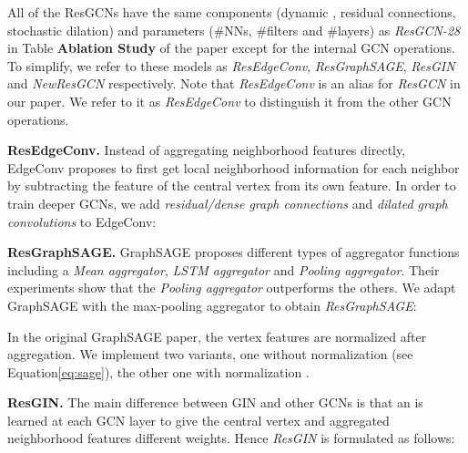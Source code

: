 \documentclass[10pt,twocolumn,letterpaper]{article}
\newcommand{\eqLabel}{Equation\xspace}
\newcommand{\mysection}[1]{\vspace{3pt}\noindent\textbf{#1.}}
\begin{document}
All of the ResGCNs have the same components (\eg dynamic , residual connections, stochastic dilation) and parameters (\eg \#NNs, \#filters and \#layers) as \emph{ResGCN-28} in Table \textbf{Ablation Study} of the paper except for the internal GCN operations. To simplify, we refer to these models as \emph{ResEdgeConv}, \emph{ResGraphSAGE}, \emph{ResGIN} and \emph{NewResGCN} respectively. Note that \emph{ResEdgeConv} is an alias for \emph{ResGCN} in our paper. We refer to it as \emph{ResEdgeConv} to distinguish it from the other GCN operations.

\mysection{ResEdgeConv} Instead of aggregating neighborhood features directly, EdgeConv \cite{wang2018dynamic} proposes to first get local neighborhood information for each neighbor by subtracting the feature of the central vertex from its own feature. In order to train deeper GCNs, we add \emph{residual/dense graph connections} and \emph{dilated graph convolutions} to EdgeConv:


\mysection{ResGraphSAGE} GraphSAGE \cite{hamilton2017inductive} proposes different types of aggregator functions including a \emph{Mean aggregator}, \emph{LSTM aggregator} and \emph{Pooling aggregator}. Their experiments show that the \emph{Pooling aggregator} outperforms the others. We adapt GraphSAGE with the max-pooling aggregator to obtain \emph{ResGraphSAGE}:



In the original GraphSAGE paper, the vertex features are normalized after aggregation. We implement two variants, one without normalization (see  \eqLabel \eqref{eq:sage}), the other one with normalization .

\mysection{ResGIN} The main difference between GIN \cite{xu2018powerful} and other GCNs is that an  is learned at each GCN layer to give the central vertex and aggregated neighborhood features different weights. Hence \emph{ResGIN} is formulated as follows:
\end{document}
